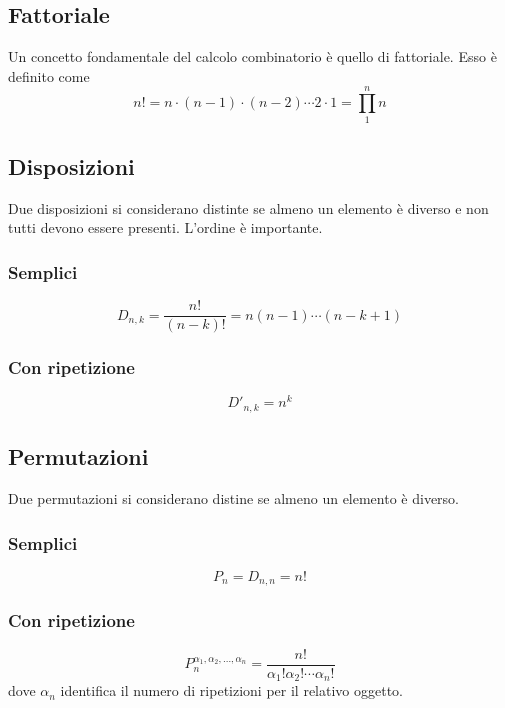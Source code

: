 \subsection{Fattoriale}
Un concetto fondamentale del calcolo combinatorio è quello di fattoriale. Esso è definito come
\begin{equation*}
  n! = n\cdot (n-1) \cdot (n-2) \dotsm 2\cdot1 = \prod\limits_{1}^{n}n
\end{equation*}

\subsection{Disposizioni}
Due disposizioni si considerano distinte se almeno un elemento è diverso e non tutti devono essere 
presenti. L'ordine è importante.

\subsubsection{Semplici}
\begin{equation*}
  D_{n,k} = \frac{n!}{(n-k)!} = n(n-1)\dotsm(n-k+1)
\end{equation*}

\subsubsection{Con ripetizione}
\begin{equation*}
  D'_{n,k} = n^k
\end{equation*}

\subsection{Permutazioni}
Due permutazioni si considerano distine se almeno un elemento è diverso.

\subsubsection{Semplici}
\begin{equation*}
  P_n = D_{n,n} = n!
\end{equation*}

\subsubsection{Con ripetizione}
\begin{equation*}
  P_n^{\alpha_1,\alpha_2,\dotsc,\alpha_n} = \frac{n!}{\alpha_1!\alpha_2!\dotsm\alpha_n!}
\end{equation*}
dove $\alpha_n$ identifica il numero di ripetizioni per il relativo oggetto.

